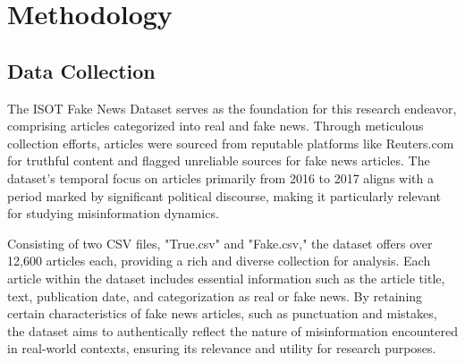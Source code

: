 \chapter{Methodology}
\label{ch:method} %

\section{Data Collection}

The ISOT Fake News Dataset serves as the foundation for this research endeavor, comprising articles categorized into real and fake news. Through meticulous collection efforts, articles were sourced from reputable platforms like Reuters.com for truthful content and flagged unreliable sources for fake news articles. The dataset's temporal focus on articles primarily from 2016 to 2017 aligns with a period marked by significant political discourse, making it particularly relevant for studying misinformation dynamics.

Consisting of two CSV files, "True.csv" and "Fake.csv," the dataset offers over 12,600 articles each, providing a rich and diverse collection for analysis. Each article within the dataset includes essential information such as the article title, text, publication date, and categorization as real or fake news. By retaining certain characteristics of fake news articles, such as punctuation and mistakes, the dataset aims to authentically reflect the nature of misinformation encountered in real-world contexts, ensuring its relevance and utility for research purposes.

